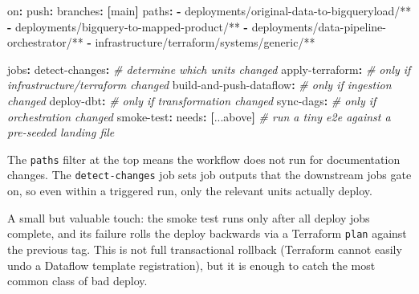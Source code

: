 \documentclass[
  11pt,
  british,
  oneside]{book}
\newenvironment{Shaded}{\begin{snugshade}}{\end{snugshade}}
\newcommand{\AttributeTok}[1]{\textcolor[rgb]{0.77,0.63,0.00}{#1}}
\newcommand{\CommentTok}[1]{\textcolor[rgb]{0.56,0.35,0.01}{\textit{#1}}}
\newcommand{\FunctionTok}[1]{\textcolor[rgb]{0.00,0.00,0.00}{#1}}
\newcommand{\KeywordTok}[1]{\textcolor[rgb]{0.13,0.29,0.53}{\textbf{#1}}}
\newcommand{\StringTok}[1]{\textcolor[rgb]{0.31,0.60,0.02}{#1}}
\begin{document}
\begin{Shaded}
\begin{Highlighting}[]
\FunctionTok{on}\KeywordTok{:}
\AttributeTok{  }\FunctionTok{push}\KeywordTok{:}
\AttributeTok{    }\FunctionTok{branches}\KeywordTok{:}\AttributeTok{ }\KeywordTok{[}\AttributeTok{main}\KeywordTok{]}
\AttributeTok{    }\FunctionTok{paths}\KeywordTok{:}
\AttributeTok{      }\KeywordTok{{-}}\AttributeTok{ }\StringTok{\textquotesingle{}deployments/original{-}data{-}to{-}bigqueryload/**\textquotesingle{}}
\AttributeTok{      }\KeywordTok{{-}}\AttributeTok{ }\StringTok{\textquotesingle{}deployments/bigquery{-}to{-}mapped{-}product/**\textquotesingle{}}
\AttributeTok{      }\KeywordTok{{-}}\AttributeTok{ }\StringTok{\textquotesingle{}deployments/data{-}pipeline{-}orchestrator/**\textquotesingle{}}
\AttributeTok{      }\KeywordTok{{-}}\AttributeTok{ }\StringTok{\textquotesingle{}infrastructure/terraform/systems/generic/**\textquotesingle{}}

\FunctionTok{jobs}\KeywordTok{:}
\AttributeTok{  }\FunctionTok{detect{-}changes}\KeywordTok{:}
\CommentTok{    \# determine which units changed}
\AttributeTok{  }\FunctionTok{apply{-}terraform}\KeywordTok{:}
\CommentTok{    \# only if infrastructure/terraform changed}
\AttributeTok{  }\FunctionTok{build{-}and{-}push{-}dataflow}\KeywordTok{:}
\CommentTok{    \# only if ingestion changed}
\AttributeTok{  }\FunctionTok{deploy{-}dbt}\KeywordTok{:}
\CommentTok{    \# only if transformation changed}
\AttributeTok{  }\FunctionTok{sync{-}dags}\KeywordTok{:}
\CommentTok{    \# only if orchestration changed}
\AttributeTok{  }\FunctionTok{smoke{-}test}\KeywordTok{:}
\AttributeTok{    }\FunctionTok{needs}\KeywordTok{:}\AttributeTok{ }\KeywordTok{[}\AttributeTok{...above}\KeywordTok{]}
\CommentTok{    \# run a tiny e2e against a pre{-}seeded landing file}
\end{Highlighting}
\end{Shaded}

The \texttt{paths} filter at the top means the workflow does not run for
documentation changes. The \texttt{detect-changes} job sets job outputs
that the downstream jobs gate on, so even within a triggered run, only
the relevant units actually deploy.

A small but valuable touch: the smoke test runs only after all deploy
jobs complete, and its failure rolls the deploy backwards via a
Terraform \texttt{plan} against the previous tag. This is not full
transactional rollback (Terraform cannot easily undo a Dataflow template
registration), but it is enough to catch the most common class of bad
deploy.
\end{document}
